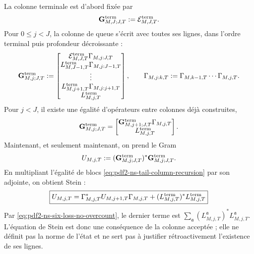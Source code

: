 La colonne terminale est d'abord fixée par
\begin{equation}\label{eq:pdf2-ns-terminal-tail-column}
 \mathbf G_{M,J;J,T}^{\rm term}:=\mathcal E_{M,J,T}^{\rm term}.
\end{equation}
Pour $0\le j<J$, la colonne de queue s'écrit avec toutes ses lignes, dans
l'ordre terminal puis profondeur décroissante :
\begin{equation}\label{eq:pdf2-ns-complete-column}
 \mathbf G_{M,j;J,T}^{\rm term}:=
 \begin{bmatrix}
  \mathcal E_{M,J,T}^{\rm term}\Gamma_{M,j:J,T}\\
  L_{M,J-1,T}^{\rm term}\Gamma_{M,j:J-1,T}\\
  \vdots\\
  L_{M,j+1,T}^{\rm term}\Gamma_{M,j:j+1,T}\\
  L_{M,j,T}^{\rm term}
 \end{bmatrix},
 \qquad
 \Gamma_{M,j:k,T}:=\Gamma_{M,k-1,T}\cdots\Gamma_{M,j,T}.
\end{equation}
Pour $j<J$, il existe une égalité d'opérateurs entre colonnes déjà construites,
\begin{equation}\label{eq:pdf2-ns-tail-column-recursion}
 \mathbf G_{M,j;J,T}^{\rm term}
 =\begin{bmatrix}
   \mathbf G_{M,j+1;J,T}^{\rm term}\Gamma_{M,j,T}\\
   L_{M,j,T}^{\rm term}
  \end{bmatrix}.
\end{equation}
Maintenant, et seulement maintenant, on prend le Gram
\begin{equation}\label{eq:pdf2-ns-tail-gram}
 U_{M,j,T}:=
 (\mathbf G_{M,j;J,T}^{\rm term})^*
 \mathbf G_{M,j;J,T}^{\rm term}.
\end{equation}
En multipliant l'égalité de blocs
\eqref{eq:pdf2-ns-tail-column-recursion} par son adjointe, on obtient Stein :
\begin{equation}\label{eq:pdf2-ns-local-stein}
 \boxed{\begin{gathered}
 U_{M,j,T}=\Gamma_{M,j,T}^*U_{M,j+1,T}\Gamma_{M,j,T}
 +(L_{M,j,T}^{\rm term})^*L_{M,j,T}^{\rm term}
 \end{gathered}}
\end{equation}
Par \eqref{eq:pdf2-ns-six-loss-no-overcount}, le dernier terme est
$\sum_{\mathfrak a}(L_{M,j,T}^{\mathfrak a})^*
L_{M,j,T}^{\mathfrak a}$. L'équation de Stein est donc une conséquence de
la colonne acceptée ; elle ne définit pas la norme de l'état et ne sert pas à justifier
rétroactivement l'existence de ses lignes.

